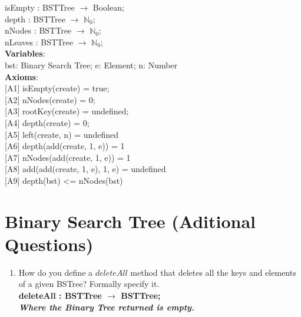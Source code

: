 \documentclass[12pt]{article}
\begin{document}
\begin{spacing}{1.5}
\hspace*{5mm} isEmpty : BSTTree $\rightarrow$ Boolean;\\
\hspace*{5mm} depth : BSTTree $\rightarrow$ $\mathbb{N}_0$;\\
\hspace*{5mm} nNodes : BSTTree $\rightarrow$ $\mathbb{N}_0$;\\
\hspace*{5mm} nLeaves : BSTTree $\rightarrow$ $\mathbb{N}_0$;\\
\noindent \textbf{Variables}:\\
\hspace*{5mm} bst: Binary Search Tree; e: Element; n: Number\\
\noindent \textbf{Axioms}:\\
\hspace*{5mm} [A1] isEmpty(create) = true;\\
\hspace*{5mm} [A2] nNodes(create) = 0;\\
\hspace*{5mm} [A3] rootKey(create) = undefined;\\
\hspace*{5mm} [A4] depth(create) = 0;\\
\hspace*{5mm} [A5] left(create, n) = undefined\\
\hspace*{5mm} [A6] depth(add(create, 1, e)) = 1\\
\hspace*{5mm} [A7] nNodes(add(create, 1, e)) = 1\\
\hspace*{5mm} [A8] add(add(create, 1, e), 1, e) = undefined\\
\hspace*{5mm} [A9] depth(bst) <= nNodes(bst)\\

\section*{Binary Search Tree (Aditional Questions)}

\begin{enumerate}

\item How do you define a $deleteAll$ method that deletes all the keys and elements of a given BSTree? Formally specify it.\\
\textbf{deleteAll : BSTTree $\rightarrow$ BSTTree; \\ \textit{Where the Binary Tree returned is empty.}}


\end{enumerate}
\end{spacing}
\end{document}
